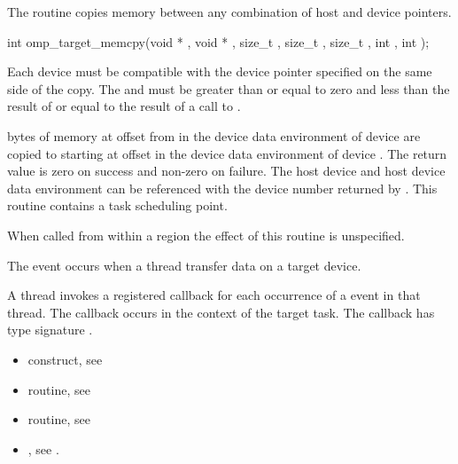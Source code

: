 The  routine copies memory between any combination
of host and device pointers.

\format
\begin{boxedcode}
int omp\_target\_memcpy(void * , void * , size\_t ,
                        size\_t , size\_t ,
                        int , int );
\end{boxedcode}

\constraints
Each device must
be compatible with the device pointer specified on the same side of the copy.
The  and 
must be greater than or equal to zero and less than the result of
 or equal to the result of a call to
.

\effect


 bytes of memory at offset  from  
in the device data environment of device  are
copied to  starting at offset  in the device data
environment of device .  
The return value is zero on success and non-zero on failure.  The host device
and host device data environment can be referenced with the device number
returned by . This routine contains a task
scheduling point.

When called from within a  region 
the effect of this routine is unspecified.

\events
The  event occurs when a thread transfer data on a target device.

\tools

A thread invokes a registered 
callback for each occurrence of a  event in that thread. 
The callback occurs in the context of the target task.  The callback has type signature
. 


\crossreferences
\begin{itemize}
\item {} construct, see 

\item {} routine, see 

\item {} routine, see 


\item {}, see 
.
\end{itemize}



